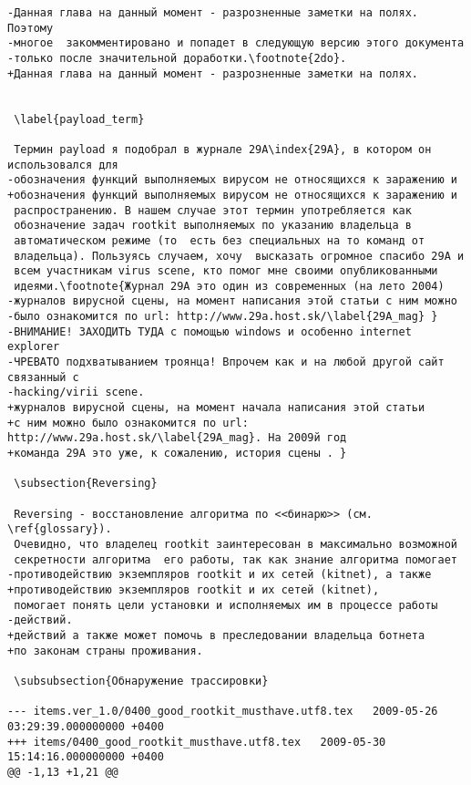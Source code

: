 \begin{verbatim}
-Данная глава на данный момент - разрозненные заметки на полях. Поэтому
-многое  закомментировано и попадет в следующую версию этого документа
-только после значительной доработки.\footnote{2do}.
+Данная глава на данный момент - разрозненные заметки на полях.


 \label{payload_term}

 Термин payload я подобрал в журнале 29A\index{29A}, в котором он использовался для
-обозначения функций выполняемых вирусом не относящихся к заражению и
+обозначения функций выполняемых вирусом не относящихся к заражению и
 распространению. В нашем случае этот термин употребляется как
 обозначение задач rootkit выполняемых по указанию владельца в
 автоматическом режиме (то  есть без специальных на то команд от
 владельца). Пользуясь случаем, хочу  высказать огромное спасибо 29A и
 всем участникам virus scene, кто помог мне своими опубликованными
 идеями.\footnote{Журнал 29A это один из современных (на лето 2004)
-журналов вирусной сцены, на момент написания этой статьи с ним можно
-было ознакомится по url: http://www.29a.host.sk/\label{29A_mag} }
-ВНИМАНИЕ! ЗАХОДИТЬ ТУДА с помощью windows и особенно internet explorer
-ЧРЕВАТО подхватыванием троянца! Впрочем как и на любой другой сайт связанный с
-hacking/virii scene.
+журналов вирусной сцены, на момент начала написания этой статьи
+с ним можно было ознакомится по url: http://www.29a.host.sk/\label{29A_mag}. На 2009й год
+команда 29A это уже, к сожалению, история сцены . }

 \subsection{Reversing}

 Reversing - восстановление алгоритма по <<бинарю>> (см. \ref{glossary}).
 Очевидно, что владелец rootkit заинтересован в максимально возможной
 секретности алгоритма  его работы, так как знание алгоритма помогает
-противодействию экземпляров rootkit и их сетей (kitnet), а также
+противодействию экземпляров rootkit и их сетей (kitnet),
 помогает понять цели установки и исполняемых им в процессе работы
-действий.
+действий а также может помочь в преследовании владельца ботнета
+по законам страны проживания.

 \subsubsection{Обнаружение трассировки}

--- items.ver_1.0/0400_good_rootkit_musthave.utf8.tex	2009-05-26 03:29:39.000000000 +0400
+++ items/0400_good_rootkit_musthave.utf8.tex	2009-05-30 15:14:16.000000000 +0400
@@ -1,13 +1,21 @@

\end{verbatim}
